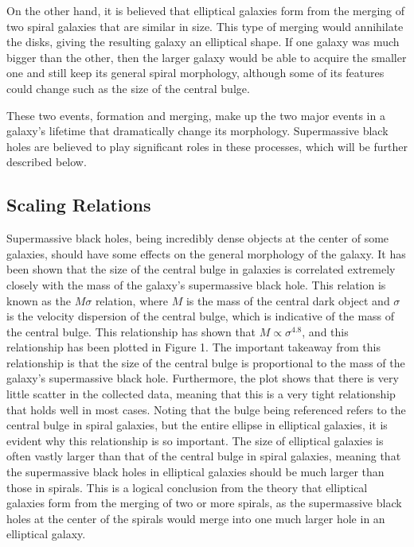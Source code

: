 \documentclass[12pt]{article}
\begin{document}
    On the other
    hand, it is believed that elliptical galaxies form from the merging of two
    spiral galaxies that are similar in size.  This type of merging would
    annihilate the disks, giving the resulting galaxy an elliptical shape.  If
    one galaxy was much bigger than the other, then the larger galaxy would be
    able to acquire the smaller one and still keep its general spiral
    morphology, although some of its features could change such as the size of
    the central bulge.

    These two events, formation and merging, make up the two major events in a
    galaxy's lifetime that dramatically change its morphology.  Supermassive
    black holes are believed to play significant roles in these processes, which
    will be further described below.


\subsection{Scaling Relations}
Supermassive black holes, being incredibly dense objects at the center of some
galaxies, should have some effects on the general morphology of the galaxy. It
has been shown that the size of the central bulge in galaxies is correlated
extremely closely with the mass of the galaxy's supermassive black hole.  This
relation is known as the $M \sigma$ relation, where $M$ is the mass of the
central dark object and $\sigma$ is the velocity dispersion of the central
bulge, which is indicative of the mass of the central bulge.  This relationship
has shown that $M \propto \sigma^{4.8}$, and this
relationship has been plotted in Figure 1.  The important takeaway from this
relationship is that the size of the central bulge is proportional to the mass
of the galaxy's supermassive black hole.  Furthermore, the plot shows that there
is very little scatter in the collected data, meaning that this is a very tight
relationship that holds well in most cases.  Noting that the bulge being
referenced refers to the central bulge in spiral galaxies, but the entire
ellipse in elliptical galaxies, it is evident why this relationship is so
important.  The size of elliptical galaxies is often vastly larger than that of
the central bulge in spiral galaxies, meaning that the supermassive black holes
in elliptical galaxies should be much larger than those in spirals.  This is a
logical conclusion from the theory that elliptical galaxies form from the
merging of two or more spirals, as the supermassive black holes at the center of
the spirals would merge into one much larger hole in an elliptical galaxy.
\end{document}
